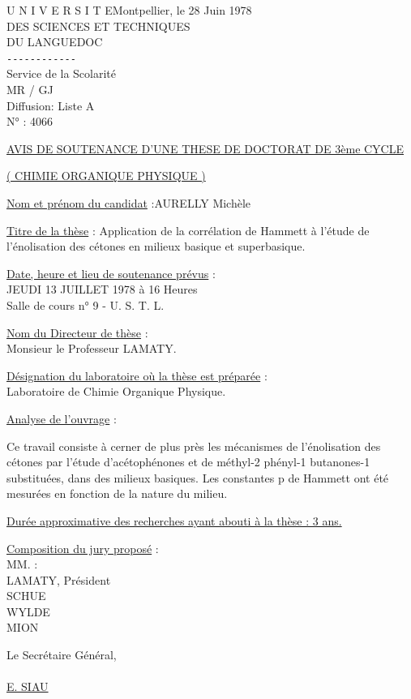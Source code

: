 \noindent U N I V E R S I T E\hfill Montpellier, le 28 Juin 1978\\
DES SCIENCES ET TECHNIQUES\\
DU LANGUEDOC\\
\texttt{-{}-{}-{}-{}-{}-{}-{}-{}-{}-{}-{}-}\\
Service de la Scolarité\\
MR / GJ\\
Diffusion\quad : Liste A\\
N° : 4066

\uline{AVIS DE SOUTENANCE D'UNE THESE DE DOCTORAT DE 3ème CYCLE}

\uline{( CHIMIE ORGANIQUE PHYSIQUE )}

\uline{Nom et prénom du candidat} :\qquad AURELLY Michèle

\uline{Titre de la thèse} : Application de la corrélation de Hammett à l'étude de l'énolisation des cétones en milieux basique et superbasique.

\uline{Date, heure et lieu de soutenance prévus} :\\
JEUDI 13 JUILLET 1978 à 16 Heures\\
Salle de cours n° 9 - U. S. T. L.

\uline{Nom du Directeur de thèse} :\\
Monsieur le Professeur LAMATY.

\uline{Désignation du laboratoire où la thèse est préparée} :\\
Laboratoire de Chimie Organique Physique.

\uline{Analyse de l'ouvrage} :

Ce travail consiste à cerner de plus près les mécanismes de l'énolisation des cétones par l'étude d'acétophénones et de méthyl-2 phényl-1 butanones-1 substituées, dans des milieux basiques. Les constantes p de Hammett ont été mesurées en fonction de la nature du milieu.

\uline{Durée approximative des recherches ayant abouti à la thèse : 3 ans.}

\uline{Composition du jury proposé} :\\
MM. :\\
LAMATY, Président\\
SCHUE\\
WYLDE\\
MION

Le Secrétaire Général,\\
\\
\uline{E. SIAU}

